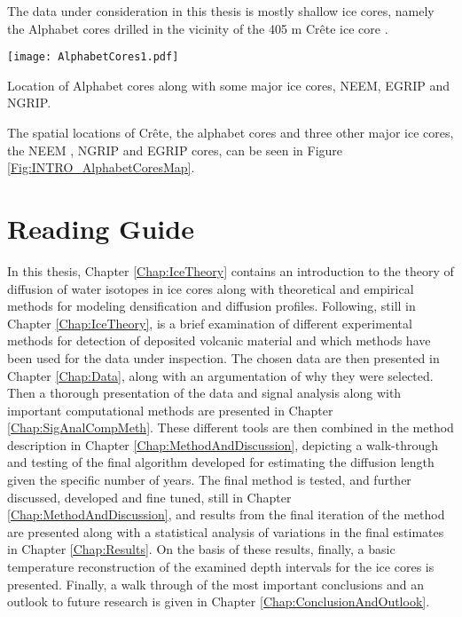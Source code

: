 \documentclass[../../CompleteThesis2/Complete_2ndDraft]{subfiles}
\begin{document}
The data under consideration in this thesis is mostly shallow ice cores, namely the Alphabet cores drilled in the vicinity of the 405 m Crête ice core \cite[H. Clausen and C. Hammer, 1988]{ClausenHammer1988}.
\begin{marginfigure}
	\centering
	\texttt{[image: AlphabetCores1.pdf]}
	\caption[Map of Greenlandic ice core locations]{\footnotesize Location of Alphabet cores along with some major ice cores, NEEM, EGRIP and NGRIP.}
	\label{Fig:INTRO_AlphabetCoresMap}
\end{marginfigure}
The spatial locations of Crête, the alphabet cores and three other major ice cores, the NEEM \cite{GkinisQuistgaard2021}, NGRIP \cite{NGRIP2014} and EGRIP \cite{EGRIP2016} cores, can be seen in Figure \ref{Fig:INTRO_AlphabetCoresMap}.  


\section[Reading Guide]{Reading Guide}

In this thesis, Chapter \ref{Chap:IceTheory} contains an introduction to the theory of diffusion of water isotopes in ice cores along with theoretical and empirical methods for modeling densification and diffusion profiles. Following, still in Chapter \ref{Chap:IceTheory}, is a brief examination of different experimental methods for detection of deposited volcanic material and which methods have been used for the data under inspection. The chosen data are then presented in Chapter \ref{Chap:Data}, along with an argumentation of why they were selected. Then a thorough presentation of the data and signal analysis along with important computational methods are presented in Chapter \ref{Chap:SigAnalCompMeth}. These different tools are then combined in the method description in Chapter \ref{Chap:MethodAndDiscussion}, depicting a walk-through and testing of the final algorithm developed for estimating the diffusion length given the specific number of years. The final method is tested, and further discussed, developed and fine tuned, still in Chapter \ref{Chap:MethodAndDiscussion}, and results from the final iteration of the method are presented along with a statistical analysis of variations in the final estimates in Chapter \ref{Chap:Results}. On the basis of these results, finally, a basic temperature reconstruction of the examined depth intervals for the ice cores is presented. Finally, a walk through of the most important conclusions and an outlook to future research is given in Chapter \ref{Chap:ConclusionAndOutlook}.
\end{document}
